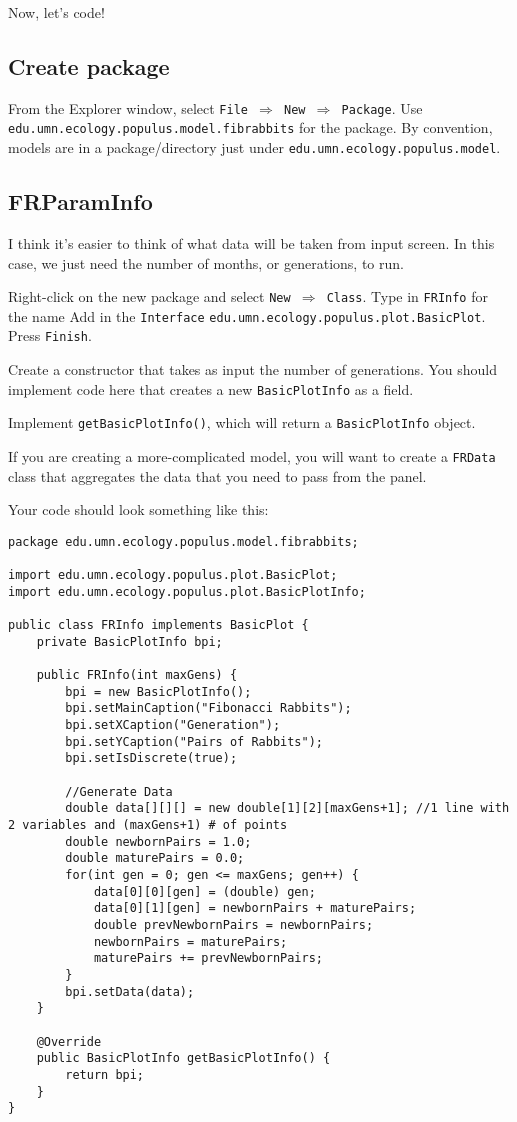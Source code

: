 \documentclass[12pt]{article}
\begin{document}
Now, let's code!

\subsection{Create package}
From the Explorer window, select \texttt{File $\Rightarrow$ New $\Rightarrow$ Package}.
Use \texttt{edu.umn.ecology.populus.model.fibrabbits} for the package.  By convention, models are in a package/directory just under \texttt{edu.umn.ecology.populus.model}.

\subsection{FRParamInfo}
I think it's easier to think of what data will be taken from input screen.  In this case, we just need the number of months, or generations, to run.

Right-click on the new package and select \texttt{New $\Rightarrow$ Class}.
Type in \texttt{FRInfo} for the name
Add in the \texttt{Interface} \texttt{edu.umn.ecology.populus.plot.BasicPlot}.
Press \texttt{Finish}.

Create a constructor that takes as input the number of generations.  You should implement code here that creates a new \texttt{BasicPlotInfo} as a field.

Implement \texttt{getBasicPlotInfo()}, which will return a \texttt{BasicPlotInfo} object.

If you are creating a more-complicated model, you will want to create a \texttt{FRData} class that aggregates the data that you need to pass from the panel.

Your code should look something like this:

\begin{verbatim}
package edu.umn.ecology.populus.model.fibrabbits;

import edu.umn.ecology.populus.plot.BasicPlot;
import edu.umn.ecology.populus.plot.BasicPlotInfo;

public class FRInfo implements BasicPlot {
    private BasicPlotInfo bpi;

    public FRInfo(int maxGens) {
        bpi = new BasicPlotInfo();
        bpi.setMainCaption("Fibonacci Rabbits");
        bpi.setXCaption("Generation");
        bpi.setYCaption("Pairs of Rabbits");
        bpi.setIsDiscrete(true);
		
        //Generate Data
        double data[][][] = new double[1][2][maxGens+1]; //1 line with 2 variables and (maxGens+1) # of points
        double newbornPairs = 1.0;
        double maturePairs = 0.0;
        for(int gen = 0; gen <= maxGens; gen++) {
            data[0][0][gen] = (double) gen;
            data[0][1][gen] = newbornPairs + maturePairs;
            double prevNewbornPairs = newbornPairs;
            newbornPairs = maturePairs;
            maturePairs += prevNewbornPairs;
        }
        bpi.setData(data);
    }
	
    @Override
    public BasicPlotInfo getBasicPlotInfo() {
        return bpi;
    }
}
\end{verbatim}
\end{document}
